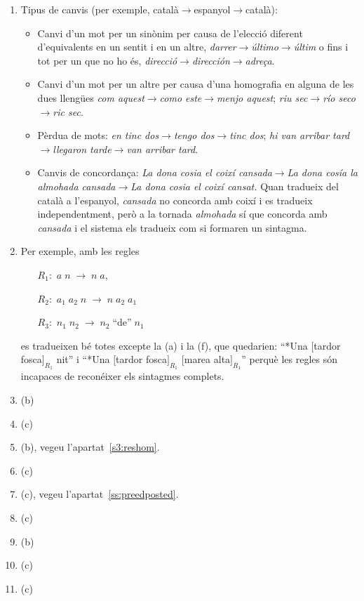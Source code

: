 \begin{enumerate}
\item Tipus de canvis (per exemple, català$\to$espanyol$\to$català):
  \begin{itemize}
  \item Canvi d'un mot per un sinònim per causa de l'elecció diferent
    d'equivalents en un sentit i en un altre,
    \emph{darrer}$\to$\emph{último}$\to$\emph{últim} o fins i tot per
    un que no ho és,
    \emph{direcció}$\to$\emph{dirección}$\to$\emph{adreça}.
  \item Canvi d'un mot per un altre per causa d'una homografia en
    alguna de les dues llengües
    \emph{com aquest}$\to$\emph{como este}$\to$\emph{menjo aquest};
    \emph{riu sec}$\to$\emph{río seco}$\to$\emph{ric sec}.
  \item Pèrdua de mots: \emph{en tinc dos}$\to$\emph{tengo
      dos}$\to$\emph{tinc dos}; \emph{hi van arribar
      tard}$\to$\emph{llegaron tarde}$\to$\emph{van arribar tard}.
  \item Canvis de concordança: \emph{La dona cosia el coixí
      cansada}$\to$\emph{La dona cosía la almohada
      cansada}$\to$\emph{La dona cosia el coixí cansat.} Quan tradueix
    del català a l'espanyol, \emph{cansada} no concorda amb coixí i es
    tradueix independentment, però a la tornada \emph{almohada} sí que
    concorda amb \emph{cansada} i el sistema els tradueix com si
    formaren un sintagma.
  \end{itemize}

\item Per exemple, amb les regles 
  \begin{itemize}
  \item[$R_1:$] $a\; n\;\to\; n\; a$, 
  \item[$R_2:$] $a_1\; a_2\; n\;\to\; n\; a_2\;
    a_1$ 
  \item[$R_3:$] $n_1\; n_2\;\to\; n_2\; \mbox{``de''}\; n_1$
\end{itemize}
es
  tradueixen bé totes excepte la (a) i la (f), que quedarien: ``*Una
  $[$tardor fosca$]_{R_1}$ nit'' i ``*Una $[$tardor fosca$]_{R_1}$
  $[$marea alta$]_{R_1}$'' perquè les regles són incapaces de reconéixer
  els sintagmes complets.
 

\item (b)
\item (c)
\item (b), vegeu l'apartat~\ref{s3:reshom}.
\item (c)
\item (c), vegeu l'apartat~\ref{ss:preedposted}.
\item (c)
\item (b)
\item (c)
\item (c)


\end{enumerate}
